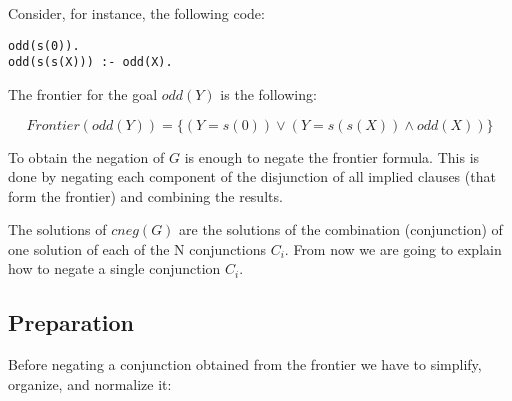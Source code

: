 \documentclass{llncs}
\begin{document}
Consider, for instance, the following code:

\begin{verbatim}
odd(s(0)).
odd(s(s(X))) :- odd(X).
\end{verbatim}

The frontier for the goal $odd (Y)$ is the following:

\[Frontier(odd(Y)) = \{ ( Y=s(0) ) \vee ( Y=s(s(X)) \wedge odd(X) ) \} \] 

To obtain the negation of $G$ is enough to negate the frontier
formula. This is done by negating each component of the disjunction of
all implied clauses (that form the frontier) and combining the
results.


The solutions of $cneg(G)$ are the solutions of the combination
(conjunction) of one solution of each of the N conjunctions
$C_i$. From now we are going to explain how to negate a single
conjunction $C_i$.




\subsection{Preparation}
\label{preparation}


Before negating a conjunction obtained from the frontier we have to
simplify, organize, and normalize it:
\end{document}
